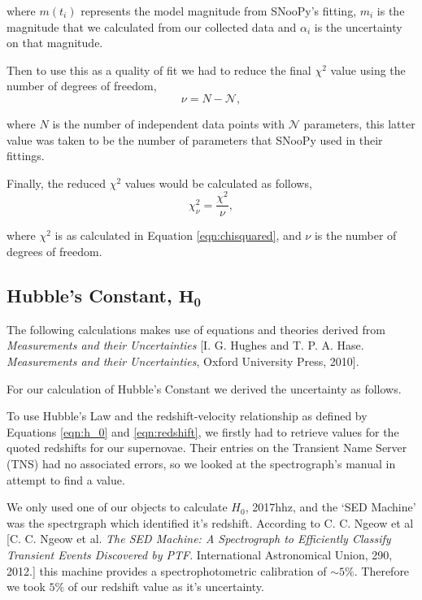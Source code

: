 \documentclass[twocolumn]{revtex4}
\begin{document}
where $m(t_i)$ represents the model magnitude from SNooPy's fitting, $m_i$ is the magnitude that we calculated from our collected data and $\alpha_i$ is the uncertainty on that magnitude.

Then to use this as a quality of fit we had to reduce the final $\chi^2$ value using the number of degrees of freedom,
\begin{equation}
\nu = N - \mathcal{N},
\end{equation}

where $N$ is the number of independent data points with $\mathcal{N}$ parameters, this latter value was taken to be the number of parameters that SNooPy used in their fittings.

Finally, the reduced $\chi^2$ values would be calculated as follows,
\begin{equation}
\chi^2_{\nu} = \frac{\chi^2}{\nu},
\end{equation}

where $\chi^2$ is as calculated in Equation \ref{eqn:chisquared}, and $\nu$ is the number of degrees of freedom.

\vspace{-2ex}
\subsection{Hubble's Constant, $\boldsymbol{H_0}$}
\vspace{-2ex}
The following calculations makes use of equations and theories derived from \textit{Measurements and their Uncertainties} [I. G. Hughes and T. P. A. Hase. \textit{Measurements and their Uncertainties}, Oxford University Press, 2010].
 
For our calculation of Hubble's Constant we derived the uncertainty as follows.  

To use Hubble's Law and the redshift-velocity relationship as defined by Equations \ref{eqn:h_0} and \ref{eqn:redshift}, we firstly had to retrieve values for the quoted redshifts for our supernovae. Their entries on the Transient Name Server (TNS) had no associated errors, so we looked at the spectrograph's manual in attempt to find a value. 

We only used one of our objects to calculate $H_0$, 2017hhz, and the `SED Machine' was the spectrgraph which identified it's redshift. According to C. C. Ngeow et al [C. C. Ngeow et al. \textit{The SED Machine: A Spectrograph to Efficiently Classify Transient Events Discovered by PTF}. International Astronomical Union, 290, 2012.] this machine provides a spectrophotometric calibration of $\sim 5\%$. Therefore we took $5\%$ of our redshift value as it's uncertainty. 
\end{document}
